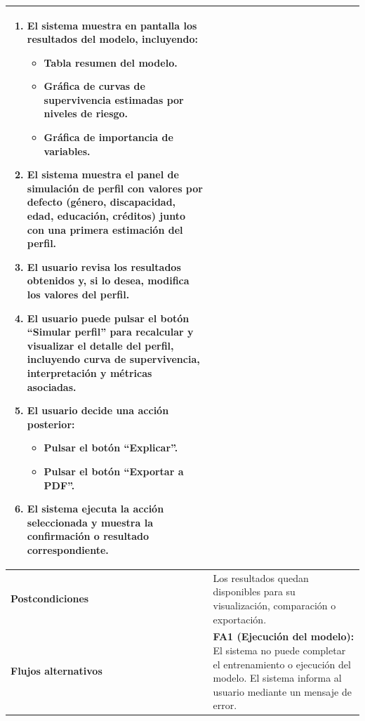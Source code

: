 \begin{longtable}{|p{4cm}|p{10cm}|}
\begin{enumerate}
    \item El sistema muestra en pantalla los resultados del modelo, incluyendo:
    \begin{itemize}
        \item Tabla resumen del modelo.
        \item Gráfica de curvas de supervivencia estimadas por niveles de riesgo.
        \item Gráfica de importancia de variables.
    \end{itemize}
    
    \item El sistema muestra el panel de simulación de perfil con valores por defecto (género, discapacidad, edad, educación, créditos) junto con una primera estimación del perfil.
    
    \item El usuario revisa los resultados obtenidos y, si lo desea, modifica los valores del perfil.
    
    \item El usuario puede pulsar el botón ``Simular perfil'' para recalcular y visualizar el detalle del perfil, incluyendo curva de supervivencia, interpretación y métricas asociadas.
    
    \item El usuario decide una acción posterior:
    \begin{itemize}
        \item Pulsar el botón ``Explicar''.
        \item Pulsar el botón ``Exportar a PDF''.
    \end{itemize}
    
    \item El sistema ejecuta la acción seleccionada y muestra la confirmación o resultado correspondiente.
\end{enumerate} \\ \hline

\textbf{Postcondiciones} & 
Los resultados quedan disponibles para su visualización, comparación o exportación. \\ \hline

\textbf{Flujos alternativos} & 
\textbf{FA1 (Ejecución del modelo):} El sistema no puede completar el entrenamiento o ejecución del modelo. El sistema informa al usuario mediante un mensaje de error. \\ \hline

\end{longtable}
\newpage


